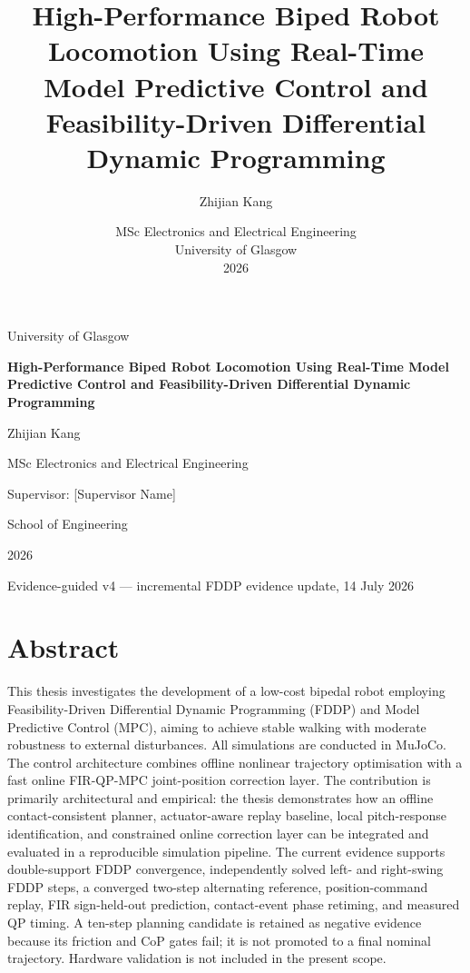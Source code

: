 \documentclass[12pt,a4paper]{report}
\title{High-Performance Biped Robot Locomotion Using Real-Time Model Predictive Control and Feasibility-Driven Differential Dynamic Programming}
\author{Zhijian Kang}
\date{MSc Electronics and Electrical Engineering\\University of Glasgow\\2026}
\newcommand{\draftversion}{Evidence-guided v4 — incremental FDDP evidence update, 14 July 2026}
\begin{document}
 
\begin{titlepage}
    \centering
    {\Large University of Glasgow\par}
    \vspace{1.5cm}
    {\LARGE\bfseries High-Performance Biped Robot Locomotion Using Real-Time Model Predictive Control and Feasibility-Driven Differential Dynamic Programming\par}
    \vspace{1.5cm}
    {\large Zhijian Kang\par}
    \vspace{0.5cm}
    {\large MSc Electronics and Electrical Engineering\par}
    \vfill
    {\large Supervisor: [Supervisor Name]\par}
    {\large School of Engineering\par}
    \vspace{1cm}
    {\large 2026\par}
    \vspace{0.5cm}
    {\large \draftversion\par}
\end{titlepage}
 
 
\chapter*{Abstract}
This thesis investigates the development of a low-cost bipedal robot employing Feasibility-Driven Differential Dynamic Programming (FDDP) and Model Predictive Control (MPC), aiming to achieve stable walking with moderate robustness to external disturbances. All simulations are conducted in MuJoCo. The control architecture combines offline nonlinear trajectory optimisation with a fast online FIR-QP-MPC joint-position correction layer. The contribution is primarily architectural and empirical: the thesis demonstrates how an offline contact-consistent planner, actuator-aware replay baseline, local pitch-response identification, and constrained online correction layer can be integrated and evaluated in a reproducible simulation pipeline. The current evidence supports double-support FDDP convergence, independently solved left- and right-swing FDDP steps, a converged two-step alternating reference, position-command replay, FIR sign-held-out prediction, contact-event phase retiming, and measured QP timing. A ten-step planning candidate is retained as negative evidence because its friction and CoP gates fail; it is not promoted to a final nominal trajectory. Hardware validation is not included in the present scope.
 
\end{document}
